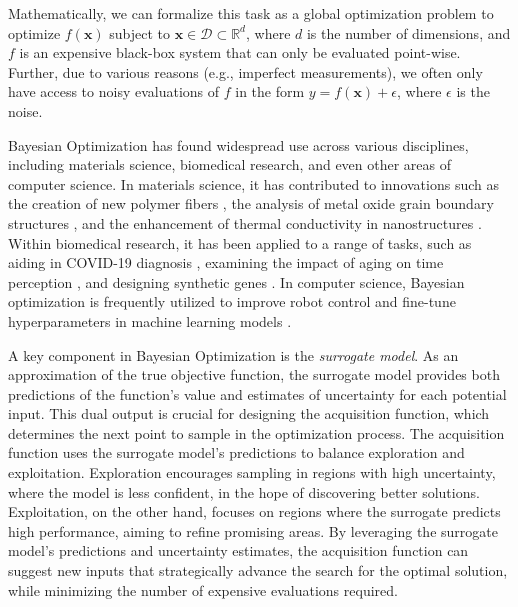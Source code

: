 Mathematically, we can formalize this task as a global optimization problem to optimize $f(\mathbf{x})$ subject to $\mathbf{x} \in \mathcal D \subset \mathbb{R}^d$, where $d$ is the number of dimensions, and $f$ is an expensive black-box system that can only be evaluated point-wise. Further, due to various reasons (e.g., imperfect measurements), we often only have access to noisy evaluations of $f$ in the form $y = f(\mathbf{x}) + \epsilon$, where $\epsilon$ is the noise.

Bayesian Optimization has found widespread use across various disciplines, including materials science, biomedical research, and even other areas of computer science. In materials science, it has contributed to innovations such as the creation of new polymer fibers \citep{li2017rapid}, the analysis of metal oxide grain boundary structures \citep{kikuchi2018bayesian}, and the enhancement of thermal conductivity in nanostructures \citep{ju2017designing}. Within biomedical research, it has been applied to a range of tasks, such as aiding in COVID-19 diagnosis \citep{nour2020novel}, examining the impact of aging on time perception \citep{turgeon2016cognitive}, and designing synthetic genes \citep{gonzalez2015bayesian}. In computer science, Bayesian optimization is frequently utilized to improve robot control \citep{berkenkamp2023bayesian} and fine-tune hyperparameters in machine learning models \citep{snoek2012practical,bergstra2012random}.

A key component in Bayesian Optimization is the \textit{surrogate model}. As an approximation of the true objective function, the surrogate model provides both predictions of the function’s value and estimates of uncertainty for each potential input. This dual output is crucial for designing the acquisition function, which determines the next point to sample in the optimization process. The acquisition function uses the surrogate model's predictions to balance exploration and exploitation. Exploration encourages sampling in regions with high uncertainty, where the model is less confident, in the hope of discovering better solutions. Exploitation, on the other hand, focuses on regions where the surrogate predicts high performance, aiming to refine promising areas. By leveraging the surrogate model's predictions and uncertainty estimates, the acquisition function can suggest new inputs that strategically advance the search for the optimal solution, while minimizing the number of expensive evaluations required.


